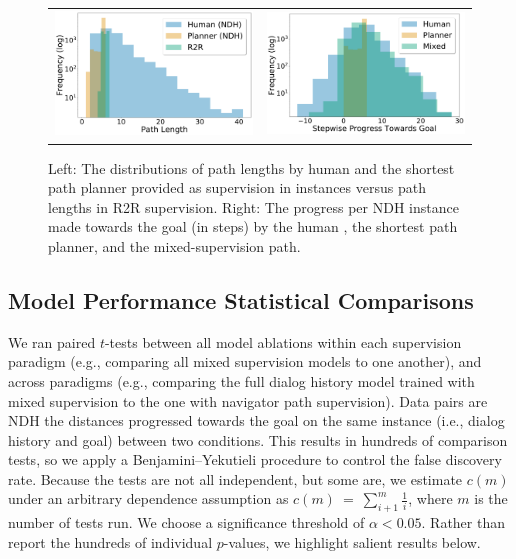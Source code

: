 \begin{figure}[ht]
\begin{tabular}{cc}
    \includegraphics[width=0.45\columnwidth]{figures/path_len_per_ndh.pdf} &
    \includegraphics[width=0.45\columnwidth]{figures/goal_red_per_ndh.pdf}
\end{tabular}
\caption{Left: The distributions of path lengths by human \nav{} and the shortest path planner provided as supervision in \task{} instances versus path lengths in R2R supervision.
Right: The progress per NDH instance made towards the goal (in steps) by the human \nav{}, the shortest path planner, and the mixed-supervision path.}
\label{fig:ndh_dists}
\end{figure}

\subsection{\task{} Model Performance Statistical Comparisons}
We ran paired $t$-tests between all model ablations within each supervision paradigm (e.g., comparing all mixed supervision models to one another), and across paradigms (e.g., comparing the full dialog history model trained with mixed supervision to the one with navigator path supervision).
Data pairs are NDH the distances progressed towards the goal on the same instance (i.e., dialog history and goal) between two conditions.
This results in hundreds of comparison tests, so we apply a Benjamini--Yekutieli procedure to control the false discovery rate.
Because the tests are not all independent, but some are, we estimate $c(m)$ under an arbitrary dependence assumption as $c(m)~=~\sum_{i+1}^{m}{\frac{1}{i}}$, where $m$ is the number of tests run.
We choose a significance threshold of $\alpha<0.05$.
Rather than report the hundreds of individual $p$-values, we highlight salient results below.

